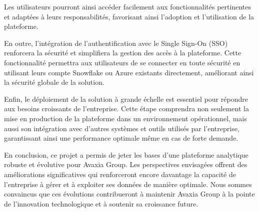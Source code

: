   Les utilisateurs pourront ainsi accéder facilement aux fonctionnalités pertinentes et adaptées à leurs responsabilités, favorisant ainsi 
  l'adoption et l'utilisation de la plateforme.
  \par En outre, l'intégration de l'authentification avec le Single Sign-On (SSO) renforcera la sécurité et simplifiera la gestion des accès à la plateforme.
   Cette fonctionnalité permettra aux utilisateurs de se connecter en toute sécurité en utilisant leurs compte Snowflake ou Azure existants directement, améliorant 
   ainsi la sécurité globale de la solution.
 \par Enfin, le déploiement de la solution à grande échelle est essentiel pour répondre aux besoins croissants de l'entreprise. Cette étape comprendra non seulement 
 la mise en production de la plateforme dans un environnement opérationnel, mais aussi son intégration avec d'autres systèmes et outils utilisés par l'entreprise, 
 garantissant ainsi une performance optimale même en cas de forte demande.

 \par En conclusion, ce projet a permis de jeter les bases d'une plateforme analytique robuste et évolutive pour Avaxia Group. Les perspectives envisagées offrent 
 des améliorations significatives qui renforceront encore davantage la capacité de l'entreprise à gérer et à exploiter ses données de manière optimale.
  Nous sommes convaincus que ces évolutions contribueront à maintenir Avaxia Group à la pointe de l'innovation technologique et à soutenir sa croissance future.
